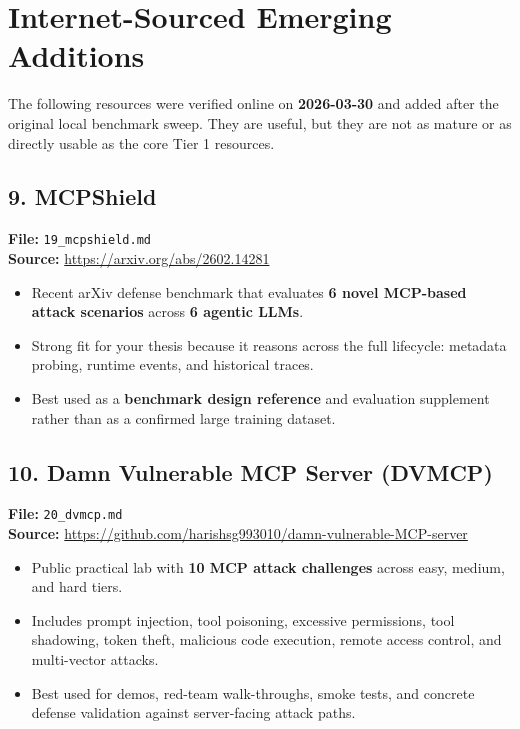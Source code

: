 \documentclass[11pt]{article}
\begin{document}
\section*{Internet-Sourced Emerging Additions}
The following resources were verified online on \textbf{2026-03-30} and added after the original local benchmark sweep.
They are useful, but they are not as mature or as directly usable as the core Tier 1 resources.

\subsection*{9. MCPShield}
\textbf{File:} \texttt{19\_mcpshield.md} \\
\textbf{Source:} \url{https://arxiv.org/abs/2602.14281}
\begin{itemize}[leftmargin=1.2em]
\item Recent arXiv defense benchmark that evaluates \textbf{6 novel MCP-based attack scenarios} across \textbf{6 agentic LLMs}.
\item Strong fit for your thesis because it reasons across the full lifecycle: metadata probing, runtime events, and historical traces.
\item Best used as a \textbf{benchmark design reference} and evaluation supplement rather than as a confirmed large training dataset.
\end{itemize}

\subsection*{10. Damn Vulnerable MCP Server (DVMCP)}
\textbf{File:} \texttt{20\_dvmcp.md} \\
\textbf{Source:} \url{https://github.com/harishsg993010/damn-vulnerable-MCP-server}
\begin{itemize}[leftmargin=1.2em]
\item Public practical lab with \textbf{10 MCP attack challenges} across easy, medium, and hard tiers.
\item Includes prompt injection, tool poisoning, excessive permissions, tool shadowing, token theft, malicious code execution, remote access control, and multi-vector attacks.
\item Best used for demos, red-team walk-throughs, smoke tests, and concrete defense validation against server-facing attack paths.
\end{itemize}
\end{document}

